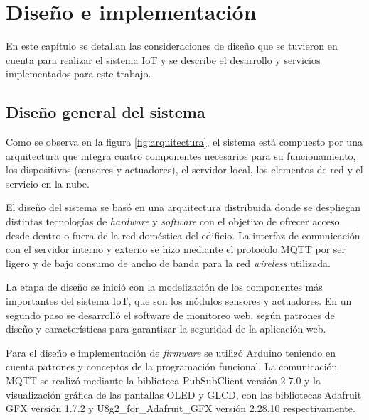 \chapter{Diseño e implementación} %

\label{Chapter3} %

En este capítulo se detallan las consideraciones de diseño que se tuvieron en cuenta para realizar el sistema IoT y se describe el desarrollo y servicios implementados para este trabajo.





\section{Diseño general del sistema}

Como se observa en la figura \ref{fig:arquitectura}, el sistema está compuesto por una arquitectura que integra cuatro componentes necesarios para su funcionamiento, los dispositivos (sensores y actuadores), el servidor local, los elementos de red y el servicio en la nube.

El diseño del sistema se basó en una arquitectura distribuida donde se despliegan distintas tecnologías de \emph{hardware} y \emph{software} con el objetivo de ofrecer acceso desde dentro o fuera de la red doméstica del edificio. La interfaz de comunicación con el servidor interno y externo se hizo mediante el protocolo MQTT por ser ligero y de bajo consumo de ancho de banda para la red \emph{wireless} utilizada. 

La etapa de diseño se inició con la modelización de los componentes más importantes del sistema IoT, que son los módulos sensores y actuadores. En un segundo paso se desarrolló el software de monitoreo web, según patrones de diseño y características para garantizar la seguridad de la aplicación web. 

Para el diseño e implementación de \emph{firmware} se utilizó Arduino teniendo en cuenta patrones y conceptos de la programación funcional. La comunicación MQTT se realizó mediante la biblioteca PubSubClient versión 2.7.0 \citep{WEBSITE:46} y la visualización gráfica de las pantallas OLED y GLCD, con las bibliotecas Adafruit GFX versión 1.7.2 \citep{WEBSITE:47} y U8g2\_for\_Adafruit\_GFX versión 2.28.10 \citep{WEBSITE:48} respectivamente.


